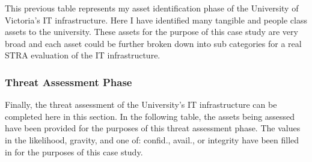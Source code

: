 \documentclass[paper=a4, fontsize=11pt]{scrartcl} %
\numberwithin{equation}{section} %
\numberwithin{figure}{section} %
\numberwithin{table}{section} %
\begin{document}
This previous table represents my asset identification phase of the University of Victoria's IT infrastructure. Here
I have identified many tangible and people class assets to the university. These assets for the purpose of this
case study are very broad and each asset could be further broken down into sub categories for a real
STRA evaluation of the IT infrastructure.


\subsubsection{Threat Assessment Phase}
\label{subsec:tap}
Finally, the threat assessment of the University's IT infrastructure can be completed here in this section.
In the following table, the assets being assessed have been provided for the purposes of this threat 
assessment phase. The values in the likelihood, gravity, and one of: confid., avail., or integrity have been filled
in for the purposes of this case study.
\end{document}
